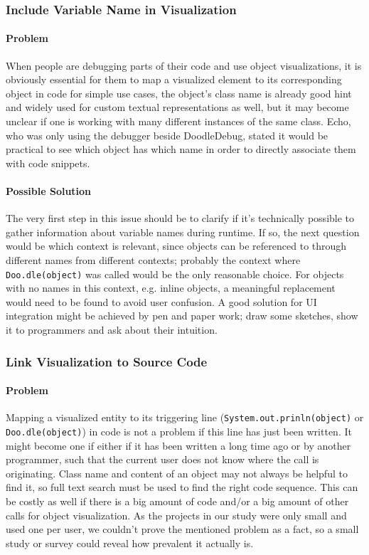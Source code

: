 \documentclass[english]{acm_proc_article-sp}
\begin{document}
\subsubsection{Include Variable Name in Visualization}

\paragraph{Problem} When people are debugging parts of their code and use object visualizations, it is obviously essential for them to map a visualized element to its corresponding object in code for simple use cases, the object's class name is already good hint and widely used for custom textual representations as well\cite{dd-study}, but it may become unclear if one is working with many different instances of the same class. Echo, who was only using the debugger beside DoodleDebug, stated it would be practical to see which object has which name in order to directly associate them with code snippets.

\paragraph{Possible Solution}
The very first step in this issue should be to clarify if it's technically possible to gather information about variable names during runtime. If so, the next question would be which context is relevant, since objects can be referenced to through different names from different contexts; probably the context where \verb-Doo.dle(object)- was called would be the only reasonable choice. For objects with no names in this context, e.g. inline objects, a meaningful replacement would need to be found to avoid user confusion. A good solution for UI integration might be achieved by pen and paper work; draw some sketches, show it to programmers and ask about their intuition.

\subsubsection{Link Visualization to Source Code}
\paragraph{Problem}
Mapping a visualized entity to its triggering line (\verb-System.out.prinln(object)- or \verb-Doo.dle(object)-) in code is not a problem if this line has just been written. It might become one if either if it has been written a long time ago or by another programmer, such that the current user does not know where the call is originating. Class name and content of an object may not always be helpful to find it, so full text search must be used to find the right code sequence. This can be costly as well if there is a big amount of code and/or a big amount of other calls for object visualization. As the projects in our study were only small and used one per user, we couldn't prove the mentioned problem as a fact, so a small study or survey could reveal how prevalent it actually is.
\end{document}
